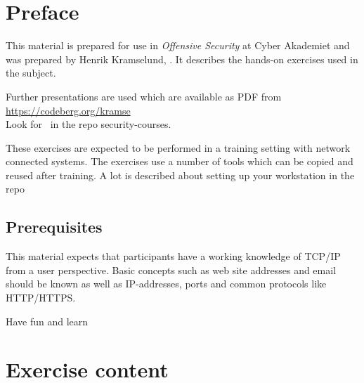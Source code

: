 \documentclass[a4paper,11pt,notitlepage]{report}
\begin{document}
\rm
{}

\newcommand{\subject}[1]{Offensive Security}
\newcommand{\kursus}[1]{Offensive Security, Cyber Akademiet}
\newcommand{\kursusnavn}[1]{Offensive Security\\ exercises}



\setcounter{tocdepth}{0}

\normal

{\color{titlecolor}\tableofcontents}

\normal
\pagestyle{fancyplain}
\chapter*{\color{titlecolor}Preface}

This material is prepared for use in \emph{Offensive Security} at Cyber Akademiet and was prepared by
Henrik Kramselund,  .
It describes the hands-on exercises used in the subject.

Further presentations are used which are available as PDF from \url{https://codeberg.org/kramse}\\
Look for \jobname\ in the repo security-courses.

These exercises are expected to be performed in a training setting with network connected systems. The exercises use a number of tools which can be copied and reused after training. A lot is described about setting up your workstation in the repo



\section*{\color{titlecolor}Prerequisites}

This material expects that participants have a working knowledge of
TCP/IP from a user perspective. Basic concepts such as web site addresses and email should be known as well as IP-addresses, ports and common protocols like HTTP/HTTPS.

\vskip 1cm
Have fun and learn
\eject

\rhead{\fancyplain{}{\bf \chaptername\ \thechapter}}

\chapter*{\color{titlecolor}Exercise content}
\end{document}
